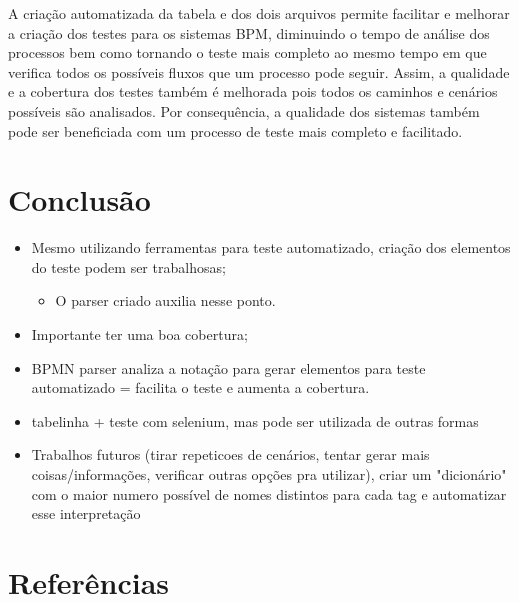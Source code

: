 \documentclass[12pt]{article}
\begin{document}
A criação automatizada da tabela e dos dois arquivos permite facilitar e melhorar a criação dos testes para os sistemas BPM, diminuindo o tempo de análise dos processos bem como tornando o teste mais completo ao mesmo tempo em que verifica todos os possíveis fluxos que um processo pode seguir. Assim, a qualidade e a cobertura dos testes também é melhorada pois todos os caminhos e cenários possíveis são analisados. Por consequência, a qualidade dos sistemas também pode ser beneficiada com um processo de teste mais completo e facilitado.

\section{Conclusão}
\begin{itemize}
\item Mesmo utilizando ferramentas para teste automatizado, criação dos elementos do teste podem ser trabalhosas;
\begin{itemize}
\item O parser criado auxilia nesse ponto.
\end{itemize}
\item Importante ter uma boa cobertura;
\item BPMN parser analiza a notação para gerar elementos para teste automatizado = facilita o teste e aumenta a cobertura.
\item tabelinha + teste com selenium, mas pode ser utilizada de outras formas 
\item Trabalhos futuros (tirar repeticoes de cenários, tentar gerar mais coisas/informações, verificar outras opções pra utilizar), criar um "dicionário" com o maior numero possível de nomes distintos para cada tag e automatizar esse interpretação
\end{itemize}

\section{Referências}



\end{document}
